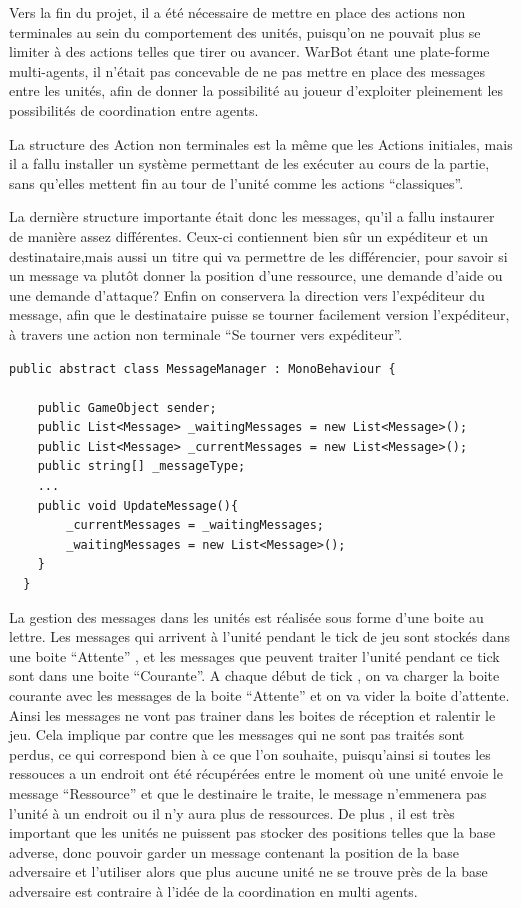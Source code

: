\documentclass{report}
\begin{document}
Vers la fin du projet, il a été nécessaire de mettre en place des actions non terminales au sein du comportement des unités, puisqu’on ne pouvait plus se limiter à des actions telles que tirer ou avancer. 
WarBot étant une plate-forme multi-agents, il n’était pas concevable de ne pas mettre en place des messages entre les unités, afin de donner la possibilité au joueur d’exploiter pleinement les possibilités de coordination entre agents.

La structure des Action non terminales est la même que les Actions initiales, mais il a fallu installer un système permettant de les exécuter au cours de la partie, sans qu’elles mettent fin au tour de l’unité comme les actions “classiques”.


La dernière structure importante était donc les messages, qu’il a fallu instaurer de manière assez différentes.
Ceux-ci contiennent bien sûr un expéditeur et un destinataire,mais aussi un titre qui va permettre de les différencier, pour savoir si un message va plutôt donner la position d’une ressource, une demande d’aide ou une demande d’attaque? Enfin on conservera la direction vers l’expéditeur du message, afin que le destinataire puisse se tourner facilement version l’expéditeur, à travers une action non terminale “Se tourner vers expéditeur”.

\begin{lstlisting}[frame=single]
public abstract class MessageManager : MonoBehaviour {

    public GameObject sender;
    public List<Message> _waitingMessages = new List<Message>();
    public List<Message> _currentMessages = new List<Message>();
    public string[] _messageType;
    ...
    public void UpdateMessage(){
        _currentMessages = _waitingMessages;
        _waitingMessages = new List<Message>();
    }
  }    
\end{lstlisting}

La gestion des messages dans les unités est réalisée sous forme d’une boite au lettre. Les messages qui arrivent à l’unité pendant le tick  de jeu sont stockés dans une boite “Attente” , et les messages que peuvent traiter l’unité pendant ce tick sont dans une boite “Courante”. A chaque début de tick , on va charger la boite courante avec les messages de la boite “Attente” et on va vider la boite d’attente. Ainsi les messages ne vont pas trainer dans les boites de réception et ralentir le jeu. Cela implique par contre que les messages qui ne sont pas traités sont perdus, ce qui correspond bien à ce que l’on souhaite, puisqu’ainsi si toutes les ressouces a un endroit ont été récupérées entre le moment où une unité envoie le message “Ressource” et que le destinaire le traite, le message n’emmenera pas l’unité à un endroit ou il n’y aura plus de ressources. De plus , il est très important que les unités ne puissent pas stocker des positions telles que la base adverse, donc pouvoir garder un message contenant la position de la base adversaire et l’utiliser alors que plus aucune unité ne se trouve près de la base adversaire est contraire à l’idée de la coordination en multi agents.
\end{document}
